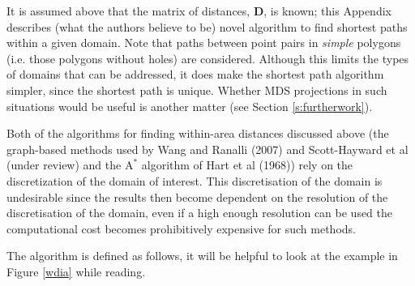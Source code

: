 \documentclass[useAMS, referee]{biom}
\begin{document}
It is assumed above that the matrix of distances, $\mathbf{D}$, is known; this Appendix describes (what the authors believe to be) novel algorithm to find shortest paths within a given domain. Note that paths between point pairs in \textit{simple} polygons (i.e. those polygons without holes) are considered. Although this limits the types of domains that can be addressed, it does make the shortest path algorithm simpler, since the shortest path is unique. Whether MDS projections in such situations would be useful is another matter (see Section \ref{s:furtherwork}).

Both of the algorithms for finding within-area distances discussed above (the graph-based methods used by Wang and Ranalli (2007) and Scott-Hayward et al (under review) and the $\text{A}^*$ algorithm of Hart et al (1968)) rely on the discretization of the domain of interest. This discretisation of the domain is undesirable since the results then become dependent on the resolution of the discretisation of the domain, even if a high enough resolution can be used the computational cost becomes prohibitively expensive for such methods.

The algorithm is defined as follows, it will be helpful to look at the example in Figure \ref{wdia} while reading.
\end{document}
